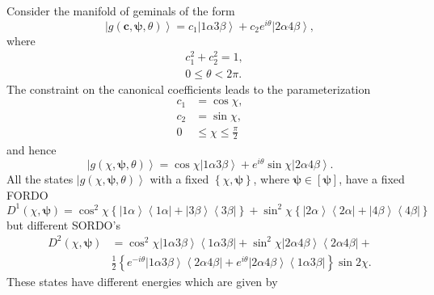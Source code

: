 \documentclass[aps,preprint]{revtex4}%
\begin{document}
Consider the manifold of geminals of the form
\begin{equation}
\left\vert g\left(  \boldsymbol{c,\psi,}\theta\right)  \right\rangle
=c_{1}\left\vert 1\alpha3\beta\right\rangle +c_{2}e^{i\theta}\left\vert
2\alpha4\beta\right\rangle ,
\end{equation}
where
\begin{align}
&  c_{1}^{2}+c_{2}^{2}=1,\nonumber\\
&  0\leq\theta<2\pi.
\end{align}
The constraint on the canonical coefficients leads to the parameterization
\begin{align}
c_{1} &  =\cos\chi,\nonumber\\
c_{2} &  =\sin\chi,\nonumber\\
0 &  \leq\chi\leq\frac{\pi}{2}%
\end{align}
and hence
\begin{equation}
\left\vert g\left(  \chi\boldsymbol{,\psi,}\theta\right)  \right\rangle
=\cos\chi\left\vert 1\alpha3\beta\right\rangle +e^{i\theta}\sin\chi\left\vert
2\alpha4\beta\right\rangle .
\end{equation}
All the states $\left\vert g\left(  \chi\boldsymbol{,\psi,}\theta\right)
\right\rangle $ with a fixed $\left\{  \chi\boldsymbol{,\psi}\right\}  $,
where $\boldsymbol{\psi\in}\left[  \boldsymbol{\psi}\right]  $, have a fixed
FORDO
\[
D^{1}\left(  \chi,\boldsymbol{\psi}\right)  =\cos^{2}\chi\left\{  \left\vert
1\alpha\right\rangle \left\langle 1\alpha\right\vert +\left\vert
3\beta\right\rangle \left\langle 3\beta\right\vert \right\}  +\sin^{2}%
\chi\left\{  \left\vert 2\alpha\right\rangle \left\langle 2\alpha\right\vert
+\left\vert 4\beta\right\rangle \left\langle 4\beta\right\vert \right\}
\]
but different SORDO's%
\begin{align}
D^{2}\left(  \chi,\boldsymbol{\psi}\right)   &  =\cos^{2}\chi\left\vert
1\alpha3\beta\right\rangle \left\langle 1\alpha3\beta\right\vert +\sin^{2}%
\chi\left\vert 2\alpha4\beta\right\rangle \left\langle 2\alpha4\beta
\right\vert +\nonumber\\
&  \frac{1}{2}\left\{  e^{-i\theta}\left\vert 1\alpha3\beta\right\rangle
\left\langle 2\alpha4\beta\right\vert +e^{i\theta}\left\vert 2\alpha
4\beta\right\rangle \left\langle 1\alpha3\beta\right\vert \right\}  \sin2\chi.
\end{align}
These states have different energies which are given by%
\end{document}
